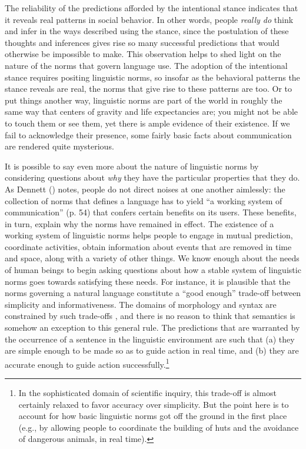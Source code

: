 The reliability of the predictions afforded by the intentional stance indicates that it reveals real patterns in social behavior. In other words, people \textit{really do} think and infer in the ways described using the stance, since the postulation of these thoughts and inferences gives rise so many successful predictions that would otherwise be impossible to make. This observation helps to shed light on the nature of the norms that govern language use. The adoption of the intentional stance requires positing linguistic norms, so insofar as the behavioral patterns the stance reveals are real, the norms that give rise to these patterns are too. Or to put things another way, linguistic norms are part of the world in roughly the same way that centers of gravity and life expectancies are; you might not be able to touch them or see them, yet there is ample evidence of their existence. If we fail to acknowledge their presence, some fairly basic facts about communication are rendered quite mysterious.

It is possible to say even more about the nature of linguistic norms by considering questions about \textit{why} they have the particular properties that they do. As Dennett (\citeyear{Dennett:2010}) notes, people do not direct noises at one another aimlessly: the collection of norms that defines a language has to yield ``a working system of communication'' (p. 54) that confers certain benefits on its users. These benefits, in turn, explain why the norms have remained in effect. The existence of a working system of linguistic norms helps people to engage in mutual prediction, coordinate activities, obtain information about events that are removed in time and space, along with a variety of other things. We know enough about the needs of human beings to begin asking questions about how a stable system of linguistic norms goes towards satisfying these needs. For instance, it is plausible that the norms governing a natural language constitute a ``good enough'' trade-off between simplicity and informativeness. The domains of morphology and syntax are constrained by such trade-offs \citep{Frank:2016}, and there is no reason to think that semantics is somehow an exception to this general rule. The predictions that are warranted by the occurrence of a sentence in the linguistic environment are such that (a) they are simple enough to be made so as to guide action in real time, and (b) they are accurate enough to guide action successfully.\footnote{In the sophisticated domain of scientific inquiry, this trade-off is almost certainly relaxed to favor accuracy over simplicity. But the point here is to account for how basic linguistic norms got off the ground in the first place (e.g., by allowing people to coordinate the building of huts and the avoidance of dangerous animals, in real time).} 

